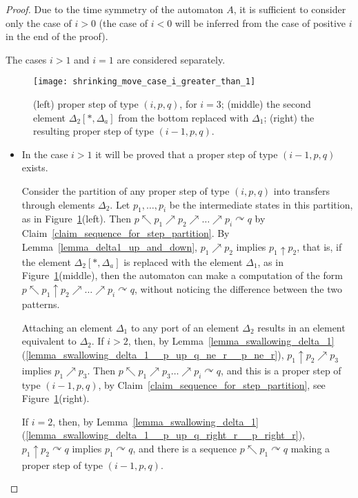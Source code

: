 \documentclass[12pt,a4paper]{article}
\theoremstyle{definition}
\begin{document}
\begin{proof}
Due to the time symmetry of the automaton $A$,
it is sufficient to consider only the case of $i > 0$
(the case of $i<0$ will be inferred from the case of positive $i$ in the end of the proof).

The cases $i > 1$ and $i = 1$ are considered separately.

\begin{figure}[t]
	\centerline{\texttt{[image: shrinking\_move\_case\_i\_greater\_than\_1]}}
	\caption{(left) proper step of type $(i,p,q)$, for $i = 3$;
	(middle) the second element $\Delta_2[*,\Delta_a]$ from the bottom replaced with $\Delta_1$;
	(right) the resulting proper step of type $(i-1,p,q)$.}
	\label{f:shrinking_move_case_i_greater_than_1}
\end{figure}

\begin{itemize}
\item
	In the case $i > 1$ it will be proved that
	a proper step of type $(i-1,p,q)$ exists.
	
	Consider the partition of any proper step of type $(i,p,q)$
	into transfers through elements $\Delta_2$.
	Let $p_1,\ldots,p_i$ be the intermediate states in this partition,
	as in Figure~\ref{f:shrinking_move_case_i_greater_than_1}(left).
	Then $p \nwarrow p_1 \nearrow p_2 \nearrow \ldots \nearrow p_i \curvearrowright q$
	by Claim~\ref{claim_sequence_for_step_partition}.
	By Lemma~\ref{lemma_delta1_up_and_down},
	$p_1 \nearrow p_2$ implies $p_1 \uparrow p_2$,
	that is, if the element $\Delta_2[*, \Delta_a]$ is replaced with the element $\Delta_1$,
	as in Figure~\ref{f:shrinking_move_case_i_greater_than_1}(middle),
	then the automaton can make a computation
	of the form $p \nwarrow p_1 \uparrow p_2 \nearrow \ldots \nearrow p_i \curvearrowright q$,
	without noticing the difference between the two patterns.
	
	Attaching an element $\Delta_1$ to any port of an element $\Delta_2$
	results in an element equivalent to $\Delta_2$.
	If $i>2$, then,
	by Lemma~\ref{lemma_swallowing_delta_1}(\ref{lemma_swallowing_delta_1__p_up_q_ne_r__p_ne_r}),
	$p_1 \uparrow p_2 \nearrow p_3$ implies $p_1 \nearrow p_3$.
	Then
	$p \nwarrow p_1 \nearrow p_3 \ldots \nearrow p_i \curvearrowright q$,
	and this is a proper step of type $(i-1,p,q)$,
	by Claim~\ref{claim_sequence_for_step_partition},
	see Figure~\ref{f:shrinking_move_case_i_greater_than_1}(right).
	
	If $i = 2$,
	then, by Lemma~\ref{lemma_swallowing_delta_1}(\ref{lemma_swallowing_delta_1__p_up_q_right_r__p_right_r}),
	$p_1 \uparrow p_2 \curvearrowright q$ implies $p_1 \curvearrowright q$,
	and there is a sequence $p \nwarrow p_1 \curvearrowright q$
	making a proper step of type $(i-1,p,q)$.
	

\end{itemize}
\end{proof}
\end{document}
